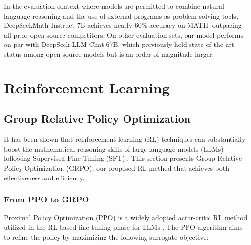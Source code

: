 In the evaluation context where models are permitted to combine natural language reasoning and the use of external programs as problem-solving tools, DeepSeekMath-Instruct 7B achieves nearly 60\% accuracy on MATH, outpacing all prior open-source competitors. On other evaluation sets, our model performs on par with DeepSeek-LLM-Chat 67B, which previously held state-of-the-art status among open-source models but is an order of magnitude larger.

\section{Reinforcement Learning}

\subsection{Group Relative Policy Optimization}

It has been shown that reinforcement learning (RL) techniques can substantially boost the mathematical reasoning skills of large language models (LLMs) following Supervised Fine-Tuning (SFT) \citep{wang2023math,wizardmath}. This section presents Group Relative Policy Optimization (GRPO), our proposed RL method that achieves both effectiveness and efficiency.

\subsubsection{From PPO to GRPO}

Proximal Policy Optimization (PPO) \citep{schulman2017proximal} is a widely adopted actor-critic RL method utilized in the RL-based fine-tuning phase for LLMs \citep{ouyang2022training}. The PPO algorithm aims to refine the policy by maximizing the following surrogate objective:

